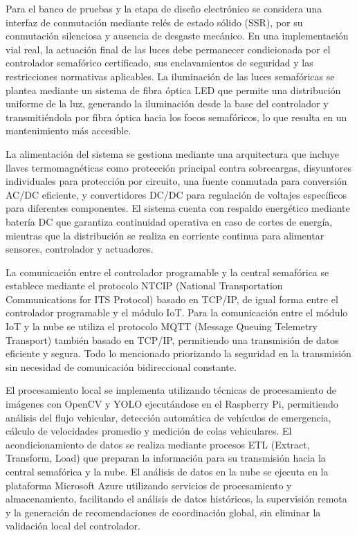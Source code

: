 \documentclass[12pt,a4paper,oneside]{report}
\begin{document}
Para el banco de pruebas y la etapa de diseño electrónico se considera una interfaz de conmutación mediante relés de estado sólido (SSR), por su conmutación silenciosa y ausencia de desgaste mecánico. En una implementación vial real, la actuación final de las luces debe permanecer condicionada por el controlador semafórico certificado, sus enclavamientos de seguridad y las restricciones normativas aplicables. La iluminación de las luces semafóricas se plantea mediante un sistema de fibra óptica LED que permite una distribución uniforme de la luz, generando la iluminación desde la base del controlador y transmitiéndola por fibra óptica hacia los focos semafóricos, lo que resulta en un mantenimiento más accesible.

La alimentación del sistema se gestiona mediante una arquitectura que incluye llaves termomagnéticas como protección principal contra sobrecargas, disyuntores individuales para protección por circuito, una fuente conmutada para conversión AC/DC eficiente, y convertidores DC/DC para regulación de voltajes específicos para diferentes componentes. El sistema cuenta con respaldo energético mediante batería DC que garantiza continuidad operativa en caso de cortes de energía, mientras que la distribución se realiza en corriente continua para alimentar sensores, controlador y actuadores.

La comunicación entre el controlador programable y la central semafórica se establece mediante el protocolo NTCIP (National Transportation Communications for ITS Protocol) basado en TCP/IP, de igual forma entre el controlador programable y el módulo IoT. Para la comunicación entre el módulo IoT y la nube se utiliza el protocolo MQTT (Message Queuing Telemetry Transport) también basado en TCP/IP, permitiendo una transmisión de datos eficiente y segura. Todo lo mencionado priorizando la seguridad en la transmisión sin necesidad de comunicación bidireccional constante.

El procesamiento local se implementa utilizando técnicas de procesamiento de imágenes con OpenCV y YOLO ejecutándose en el Raspberry Pi, permitiendo análisis del flujo vehicular, detección automática de vehículos de emergencia, cálculo de velocidades promedio y medición de colas vehiculares. El acondicionamiento de datos se realiza mediante procesos ETL (Extract, Transform, Load) que preparan la información para su transmisión hacia la central semafórica y la nube. El análisis de datos en la nube se ejecuta en la plataforma Microsoft Azure utilizando servicios de procesamiento y almacenamiento, facilitando el análisis de datos históricos, la supervisión remota y la generación de recomendaciones de coordinación global, sin eliminar la validación local del controlador.
\end{document}
